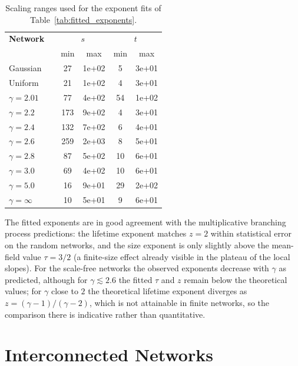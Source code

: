 \begin{table}[htbp]
    \centering
    \begin{tabular}{lc|cc|cc}
        \toprule
        \textbf{Network} && \multicolumn{2}{c|}{$s$} & \multicolumn{2}{c}{$t$} \\
        & & min & max & min & max \\
        \midrule
        Gaussian && 27 & 1e+02 & 5 & 3e+01 \\
        Uniform && 21 & 1e+02 & 4 & 3e+01 \\
        $\gamma = 2.01$ && 77 & 4e+02 & 54 & 1e+02 \\
        $\gamma = 2.2$ && 173 & 9e+02 & 4 & 3e+01 \\
        $\gamma = 2.4$ && 132 & 7e+02 & 6 & 4e+01 \\
        $\gamma = 2.6$ && 259 & 2e+03 & 8 & 5e+01 \\
        $\gamma = 2.8$ && 87 & 5e+02 & 10 & 6e+01 \\
        $\gamma = 3.0$ && 69 & 4e+02 & 10 & 6e+01 \\
        $\gamma = 5.0$ && 16 & 9e+01 & 29 & 2e+02 \\
        $\gamma = \infty$ && 10 & 5e+01 & 9 & 6e+01 \\
        \bottomrule
    \end{tabular}
    \caption{Scaling ranges used for the exponent fits of Table~\ref{tab:fitted_exponents}.}
    \label{tab:fit_ranges}
\end{table}

\noindent The fitted exponents are in good agreement with the multiplicative branching process predictions: the lifetime exponent matches $z = 2$ within statistical error on the random networks, and the size exponent is only slightly above the mean-field value $\tau = 3/2$ (a finite-size effect already visible in the plateau of the local slopes).
For the scale-free networks the observed exponents decrease with $\gamma$ as predicted, although for $\gamma \lesssim 2.6$ the fitted $\tau$ and $z$ remain below the theoretical values; for $\gamma$ close to $2$ the theoretical lifetime exponent diverges as $z = (\gamma-1)/(\gamma-2)$, which is not attainable in finite networks, so the comparison there is indicative rather than quantitative.

\section{Interconnected Networks}

